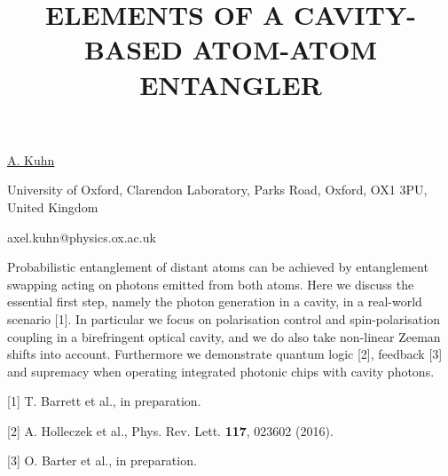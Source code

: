 \title{ELEMENTS OF A CAVITY-BASED ATOM-ATOM ENTANGLER}

\underline{A. Kuhn} 

{\normalsize{\vspace{-4mm}
University of Oxford,
Clarendon Laboratory,
Parks Road,
Oxford, OX1 3PU,
United Kingdom

\email axel.kuhn@physics.ox.ac.uk}}

Probabilistic entanglement of distant atoms can be achieved by entanglement swapping acting on photons emitted from both atoms. Here we discuss the essential first step, namely the photon generation in a cavity, in a real-world scenario [1]. In particular we focus on polarisation control and spin-polarisation coupling in a birefringent optical cavity, and we do also take  non-linear Zeeman shifts into account. Furthermore we demonstrate quantum logic [2], feedback [3] and supremacy when operating integrated photonic chips with cavity photons.

{\normalsize
[1] T. Barrett et al., in preparation.
\vsp

[2] A. Holleczek et al., Phys. Rev. Lett. \textbf{117}, 023602 (2016).
\vsp

[3] O. Barter et al., in preparation.
}

\vspace{\baselineskip} 